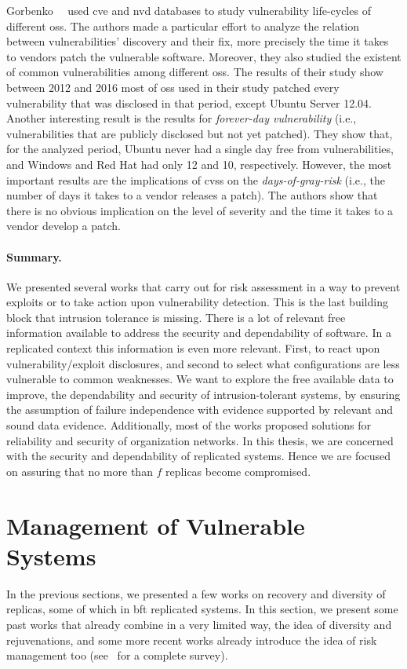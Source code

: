 Gorbenko~\etal{}~\cite{Gorbenko:2017} used \gls{cve} and \gls{nvd} databases to study vulnerability life-cycles of different \glspl{os}.
The authors made a particular effort to analyze the relation between vulnerabilities' discovery and their fix, more precisely the time it takes to vendors patch the vulnerable software.
Moreover, they also studied the existent of common vulnerabilities among different \glspl{os}.
The results of their study show between 2012 and 2016 most of \glspl{os} used in their study patched every vulnerability that was disclosed in that period, except Ubuntu Server 12.04.
Another interesting result is the results for \emph{forever-day vulnerability} (i.e., vulnerabilities that are publicly disclosed but not yet patched). 
They show that, for the analyzed period, Ubuntu never had a single day free from vulnerabilities, and Windows and Red Hat had only 12 and 10, respectively.
However, the most important results are the implications of \gls{cvss} on the \emph{days-of-gray-risk} (i.e., the number of days it takes to a vendor releases a patch). 
The authors show that there is no obvious implication on the level of severity and the time it takes to a vendor develop a patch.


\paragraph{Summary.} 
We presented several works that carry out for risk assessment in a way to prevent exploits or to take action upon vulnerability detection. 
This is the last building block that intrusion tolerance is missing. 
There is a lot of relevant free information available to address the security and dependability of software. 
In a replicated context this information is even more relevant. 
First, to react upon vulnerability/exploit disclosures, and second to select what configurations are less vulnerable to common weaknesses. 
We want to explore the free available data to improve, the dependability and security of intrusion-tolerant systems, by ensuring the assumption of failure independence with evidence supported by relevant and sound data evidence.
Additionally, most of the works proposed solutions for reliability and security of organization networks. 
In this thesis, we are concerned with the security and dependability of replicated systems. Hence we are focused on assuring that no more than $f$ replicas become compromised.



\section{Management of Vulnerable Systems}
In the previous sections, we presented a few works on recovery and diversity of replicas, some of which in \gls{bft} replicated systems.
In this section, we present some past works that already combine in a very limited way, the idea of diversity and rejuvenations, and some more recent works already introduce the idea of risk management too (see~\cite{Yuan:2014} for a complete survey).


